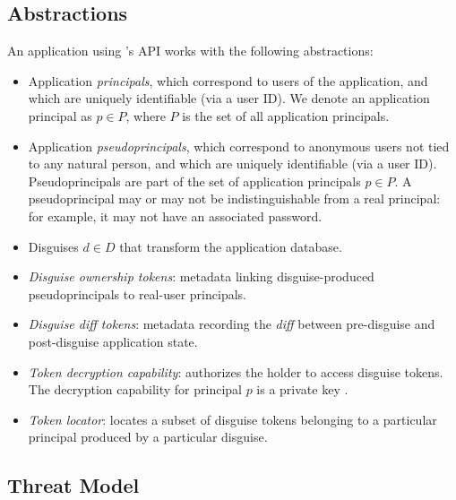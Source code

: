 \subsection{\sys Abstractions}
An application using \sys's API works with the following \sys abstractions:
\begin{itemize}
    \item Application \emph{principals}, which correspond to users of the application, 
	and which are uniquely identifiable (\eg via a user ID).
	We denote an application principal as $p \in P$, where $P$ is the set of all application principals.
    \item Application \emph{pseudoprincipals}, which correspond to anonymous users not tied to any natural
    person, and which are uniquely identifiable (\eg via a user ID).
	Pseudoprincipals are part of the set of application principals $p \in P$.
    A pseudoprincipal may or may not be indistinguishable from a real principal: for example, it 
        may not have an associated password.
    \item Disguises $d \in D$ %
        that transform the application database.
    \item \emph{Disguise ownership tokens}: metadata linking
        disguise-produced pseudoprincipals to real-user principals.
    \item \emph{Disguise diff tokens}: metadata recording the \emph{diff} between pre-disguise and
        post-disguise application state.
    \item \emph{Token decryption capability}: authorizes the holder to access disguise tokens. 
        The decryption capability for principal $p$ is a private key .
    \item \emph{Token locator}: locates a subset of disguise tokens belonging to a particular
        principal produced by a particular disguise.
\end{itemize}

\subsection{Threat Model}
\label{s:threat}


